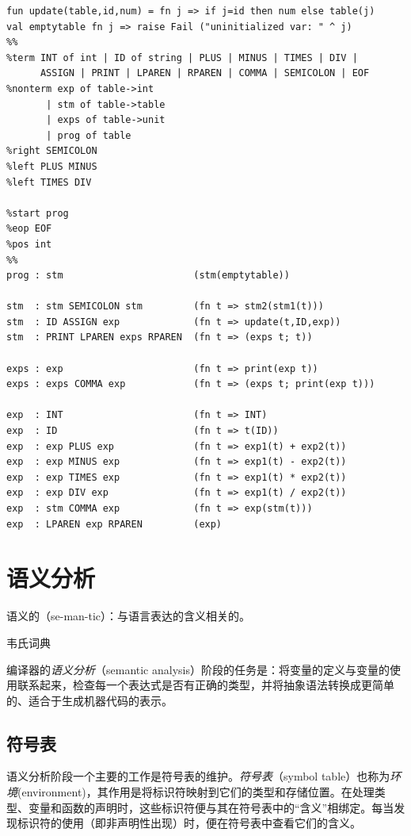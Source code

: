 \documentclass[cn,11pt,chinese]{elegantbook}
\begin{document}
\begin{lstlisting}[caption={直线型程序的解释器},label={code:4-4}]
fun update(table,id,num) = fn j => if j=id then num else table(j)
val emptytable fn j => raise Fail ("uninitialized var: " ^ j)
%%
%term INT of int | ID of string | PLUS | MINUS | TIMES | DIV |
      ASSIGN | PRINT | LPAREN | RPAREN | COMMA | SEMICOLON | EOF
%nonterm exp of table->int
       | stm of table->table
       | exps of table->unit
       | prog of table
%right SEMICOLON
%left PLUS MINUS
%left TIMES DIV

%start prog
%eop EOF
%pos int
%%
prog : stm                       (stm(emptytable))

stm  : stm SEMICOLON stm         (fn t => stm2(stm1(t)))
stm  : ID ASSIGN exp             (fn t => update(t,ID,exp))
stm  : PRINT LPAREN exps RPAREN  (fn t => (exps t; t))

exps : exp                       (fn t => print(exp t))
exps : exps COMMA exp            (fn t => (exps t; print(exp t)))

exp  : INT                       (fn t => INT)
exp  : ID                        (fn t => t(ID))
exp  : exp PLUS exp              (fn t => exp1(t) + exp2(t))
exp  : exp MINUS exp             (fn t => exp1(t) - exp2(t))
exp  : exp TIMES exp             (fn t => exp1(t) * exp2(t))
exp  : exp DIV exp               (fn t => exp1(t) / exp2(t))
exp  : stm COMMA exp             (fn t => exp(stm(t)))
exp  : LPAREN exp RPAREN         (exp)
\end{lstlisting}

\chapter{语义分析}

\epigraph{语义的（se-man-tic）：与语言表达的含义相关的。}{韦氏词典}

编译器的\textit{语义分析}（semantic analysis）阶段的任务是：将变量的定义与变量的使用联系起来，检查每一个表达式是否有正确的类型，并将抽象语法转换成更简单的、适合于生成机器代码的表示。

\section{符号表}

语义分析阶段一个主要的工作是符号表的维护。\textit{符号表}（symbol table）也称为\textit{环境}(environment)，其作用是将标识符映射到它们的类型和存储位置。在处理类型、变量和函数的声明时，这些标识符便与其在符号表中的“含义”相绑定。每当发现标识符的使用（即非声明性出现）时，便在符号表中查看它们的含义。
\end{document}
